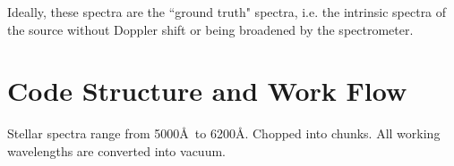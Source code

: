 Ideally, these spectra are the ``ground truth"
spectra, i.e. the intrinsic spectra of the source without Doppler
shift or being broadened by the spectrometer. 



\section{Code Structure and Work Flow}

Stellar spectra range from 5000\AA\ to 6200\AA. Chopped into
chunks. All working wavelengths are converted into vacuum. 
